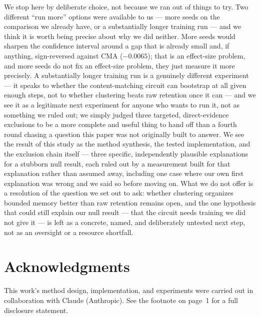 \documentclass[11pt]{article}
\begin{document}
We stop here by deliberate choice, not because we ran out of things to try. Two different
``run more'' options were available to us --- more seeds on the comparison we already have, or a
substantially longer training run --- and we think it is worth being precise about why we did
neither. More seeds would sharpen the confidence interval around a gap that is already small and,
if anything, sign-reversed against CMA ($-0.0065$); that is an effect-size problem, and more
seeds do not fix an effect-size problem, they just measure it more precisely. A substantially
longer training run is a genuinely different experiment --- it speaks to whether the
content-matching circuit can bootstrap at all given enough steps, not to whether clustering beats
raw retention once it can --- and we see it as a legitimate next experiment for anyone who wants
to run it, not as something we ruled out; we simply judged three targeted, direct-evidence
exclusions to be a more complete and useful thing to hand off than a fourth round chasing a
question this paper was not originally built to answer. We see the result of this study as the
method synthesis, the tested implementation, and the exclusion chain itself --- three specific,
independently plausible explanations for a stubborn null result, each ruled out by a measurement
built for that explanation rather than assumed away, including one case where our own first
explanation was wrong and we said so before moving on. What we do not offer is a resolution of the
question we set out to ask: whether clustering organizes bounded memory better than raw retention
remains open, and the one hypothesis that could still explain our null result --- that the circuit
needs training we did not give it --- is left as a concrete, named, and deliberately untested
next step, not as an oversight or a resource shortfall.

\section*{Acknowledgments}
This work's method design, implementation, and experiments were carried out in collaboration
with Claude (Anthropic). See the footnote on page~1 for a full disclosure statement.
\end{document}
